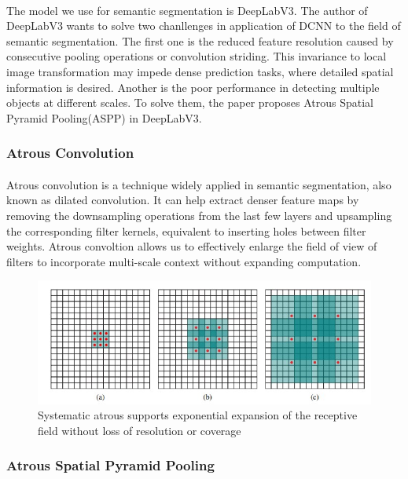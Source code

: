 \paragraph{}
The model we use for semantic segmentation is DeepLabV3\cite{2017Rethinking}. The author of DeepLabV3 wants to solve two chanllenges in application of DCNN to the field of semantic segmentation. The first one is the reduced feature resolution caused by consecutive pooling operations or convolution striding. This invariance to local image transformation may impede dense prediction tasks, where detailed spatial information is desired. Another is the poor performance in detecting multiple objects at different scales. To solve them, the paper proposes Atrous Spatial Pyramid Pooling(ASPP) in DeepLabV3.

\subsubsection{Atrous Convolution}
\paragraph{}
Atrous convolution is a technique widely applied in semantic segmentation, also known as dilated convolution. It can help extract denser feature maps by removing the downsampling operations from the last few layers and upsampling the corresponding filter kernels, equivalent to inserting holes between filter weights. Atrous convoltion allows us to effectively enlarge the field of view of filters to incorporate multi-scale context\cite{dilatedcon} without expanding computation.

\begin{figure}
    \centering
    \includegraphics{Section3/dilated convolution.jpg}
    \caption{Systematic atrous supports exponential expansion of the receptive field without loss of resolution or coverage}
    \label{fig:dilated}
\end{figure}

\subsubsection{Atrous Spatial Pyramid Pooling}
